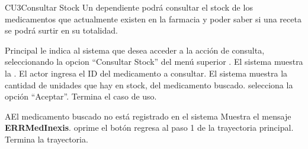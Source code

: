 
% 



	\begin{UseCase}{CU3}{Consultar Stock}{
		Un dependiente podrá consultar el stock de los medicamentos que actualmente existen en la farmacia y poder saber si una receta se podrá surtir en su totalidad.
	}
	\end{UseCase}

	\begin{UCtrayectoria}{Principal}
		\UCpaso[\UCactor] le indica al sistema que desea acceder a la acci\'on de consulta, seleccionando la opcion "`Consultar Stock"' del men\'u superior .
		\UCpaso El sistema muestra la \label{IUConsulta} .
		\UCpaso[\UCactor] El actor ingresa el ID del medicamento a consultar. 
		\UCpaso El sistema muestra la cantidad de unidades que hay en stock, del medicamento buscado. 
		\UCpaso [\UCactor] selecciona la opción "`Aceptar"'. 
		\UCpaso[] Termina el caso de uso.
	\end{UCtrayectoria}
		
		\begin{UCtrayectoriaA}{A}{El medicamento buscado no est\'a registrado en el sistema}
			\UCpaso Muestra el mensaje {\bf ERRMedInexis}.
			\UCpaso[\UCactor] oprime el botón 
			\UCpaso[\UCactor] regresa al paso 1 de la trayectoria principal.  
			\UCpaso[] Termina la trayectoria.
		\end{UCtrayectoriaA}
		
		
		
